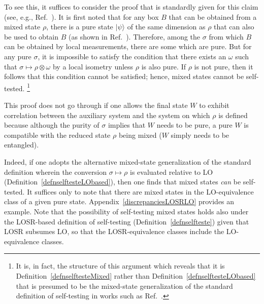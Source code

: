 \documentclass[prx,11pt,letterpaper,twocolumn,accepted=2023-11-27]{quantumarticle}
\theoremstyle{plain}
\theoremstyle{definition}
\begin{document}
To see this, it suffices to consider the proof that is standardly given for this claim 
 (see, e.g., Ref.~\cite{vsupic2020self}).  It is first noted that for any box $B$ that can be obtained from a mixed state $\rho$, there is a pure state $|\psi\rangle$ of the same dimension as $\rho$ that can also be used to obtain $B$ (as shown in Ref.~\cite{Sikora2016HSD}).  Therefore, among the $\sigma$ from which $B$ can be obtained by local measurements, there are some which are pure.  But for any pure $\sigma$, it is impossible to satisfy the condition that there exists an $\omega$ such that $\sigma \mapsto \rho \otimes \omega$ by a local isometry unless $\rho$ is also pure. If $\rho$ is not pure, then it follows that this condition cannot be satisfied; hence, mixed states cannot be self-tested.
 \footnote{It is, in fact, the structure of this argument which reveals that it is Definition~\ref{defnselftesteMixed} rather than Definition~\ref{defnselftesteLObased} that is presumed to be the mixed-state generalization of the standard definition of self-testing in works such as Ref.~\cite{vsupic2020self}.}
 
 
This proof does not go through if one allows the final state $W$ to exhibit correlation between the auxiliary system and the system on which $\rho$ is defined because although the purity of $\sigma$ implies that $W$ needs to be pure, a pure $W$ is compatible with the reduced state $\rho$ being mixed ($W$ simply needs to be entangled).

Indeed, if one adopts the alternative mixed-state generalization of the standard definition wherein the conversion $\sigma \mapsto \rho$ is evaluated relative to LO (Definition~\ref{defnselftesteLObased}), then one finds that mixed states {\em can} be self-tested.  It suffices only to note that there are mixed states in the LO-equivalence class of a given pure state.  Appendix~\ref{discrepanciesLOSRLO} provides an example. 
Note that the possibility of self-testing mixed states holds also under the LOSR-based definition of self-testing (Definition~\ref{defnselfteste}) given that LOSR subsumes LO, so that the LOSR-equivalence classes include the LO-equivalence classes.
\end{document}
